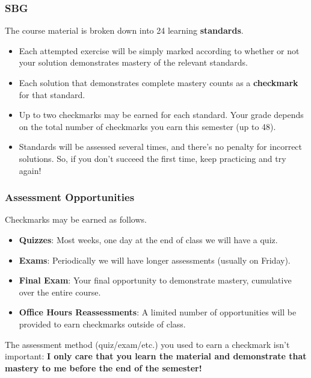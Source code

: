 \documentclass[aspectration=1610]{beamer}
\begin{document}
\begin{frame}\frametitle{SBG}
The course material is broken down into 24 learning \textbf{standards}.
\begin{itemize}
\item Each attempted exercise will be simply marked according to whether or not
      your solution demonstrates mastery of the relevant standards.
\item Each solution that demonstrates complete mastery counts as a
      \textbf{checkmark} for that standard.
\item Up to two checkmarks may be earned for each standard. Your grade depends
      on the total number of checkmarks you earn this semester (up to 48).
\item Standards will be assessed several times, and there's no penalty for
      incorrect solutions. So, if you don't succeed the first time,
      keep practicing and try again!
\end{itemize}
\end{frame}

\begin{frame}\frametitle{Assessment Opportunities}
Checkmarks may be earned as follows.
\begin{itemize}
\item {\bf Quizzes}: Most weeks, one day at the end of class we will have a quiz. 
\item {\bf Exams}: Periodically we will have longer assessments (usually on Friday).
\item {\bf Final Exam}: Your final opportunity to demonstrate mastery,
      cumulative over the entire course.
\item {\bf Office Hours Reassessments}: A limited number of opportunities
      will be provided to earn checkmarks outside of class.
\end{itemize}

\pause

\vspace{0.2in}

The assessment method (quiz/exam/etc.) you used to earn a checkmark
isn't important: \textbf{I only care that you
learn the material and demonstrate that mastery to me before the end of the
semester!}
\end{frame}
\end{document}
